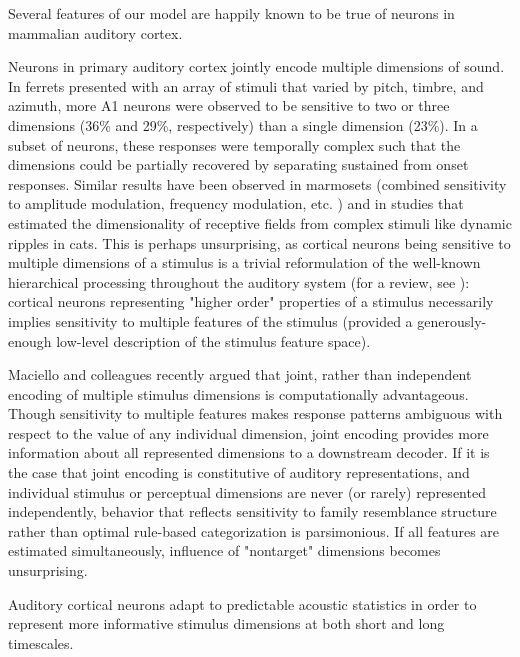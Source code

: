 Several features of our model are happily known to be true of neurons in mammalian auditory cortex. 

Neurons in primary auditory cortex jointly encode multiple dimensions of sound\citep{kingRecentAdvancesUnderstanding2018a}. In ferrets presented with an array of stimuli that varied by pitch, timbre, and azimuth\citep{bizleyInterdependentEncodingPitch2009b}, more A1 neurons were observed to be sensitive to two or three dimensions (36\% and 29\%, respectively) than a single dimension (23\%). In a subset of neurons, these responses were temporally complex such that the dimensions could be partially recovered by separating sustained from onset responses\citep{walkerMultiplexedRobustRepresentations2011}. Similar results have been observed in marmosets (combined sensitivity to amplitude modulation, frequency modulation, etc. \citep{Wang2005a}) and in studies that estimated the dimensionality of receptive fields from complex stimuli like dynamic ripples in cats\citep{atencioMultidimensionalReceptiveField2017}. This is perhaps unsurprising, as cortical neurons being sensitive to multiple dimensions of a stimulus is a trivial reformulation of the well-known hierarchical processing throughout the auditory system (for a review, see \citep{sharpeeHierarchicalRepresentationsAuditory2011b}): cortical neurons representing "higher order" properties of a stimulus necessarily implies sensitivity to multiple features of the stimulus (provided a generously-enough low-level description of the stimulus feature space).

Maciello and colleagues recently argued that joint, rather than independent encoding of multiple stimulus dimensions is computationally advantageous\citep{macellaioWhySensoryNeurons2020}. Though sensitivity to multiple features makes response patterns ambiguous with respect to the value of any individual dimension, joint encoding provides more information about all represented dimensions to a downstream decoder. If it is the case that joint encoding is constitutive of auditory representations, and individual stimulus or perceptual dimensions are never (or rarely) represented independently, behavior that reflects sensitivity to family resemblance structure rather than optimal rule-based categorization is parsimonious. If all features are estimated simultaneously, influence of "nontarget" dimensions becomes unsurprising. 

Auditory cortical neurons adapt to predictable acoustic statistics in order to represent more informative stimulus dimensions at both short and long timescales. 

